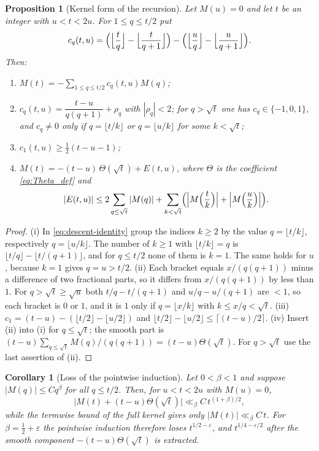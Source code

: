 \documentclass[11pt]{amsart}
\numberwithin{equation}{section}
\theoremstyle{plain}
\newtheorem{proposition}[theorem]{Proposition}
\newtheorem{corollary}[theorem]{Corollary}
\theoremstyle{definition}
\theoremstyle{remark}
\newcommand{\eps}{\varepsilon}
\begin{document}
\begin{proposition}[Kernel form of the recursion]
\label{prop:kernel}
Let $M(u)=0$ and let $t$ be an integer with $u<t<2u$. For $1\le q\le t/2$ put
\[
c_q(t,u)=\Bigl(\Bigl\lfloor\frac tq\Bigr\rfloor-\Bigl\lfloor\frac t{q+1}\Bigr\rfloor\Bigr)
-\Bigl(\Bigl\lfloor\frac uq\Bigr\rfloor-\Bigl\lfloor\frac u{q+1}\Bigr\rfloor\Bigr).
\]
Then:
\begin{enumerate}[label=\textup{(\roman*)}]
\item $M(t)=-\sum_{1\le q\le t/2}c_q(t,u)M(q)$;
\item $c_q(t,u)=\dfrac{t-u}{q(q+1)}+\rho_q$ with $|\rho_q|<2$; for $q>\sqrt t$
one has $c_q\in\{-1,0,1\}$, and $c_q\ne0$ only if $q=\lfloor t/k\rfloor$ or
$q=\lfloor u/k\rfloor$ for some $k<\sqrt t$;
\item $c_1(t,u)\ge\frac12(t-u-1)$;
\item $M(t)=-(t-u)\,\Theta(\sqrt t)+E(t,u)$, where $\Theta$ is the
coefficient \eqref{eq:Theta_def} and
\[
|E(t,u)|\le2\sum_{q\le\sqrt t}|M(q)|
+\sum_{k<\sqrt t}\Bigl(\Bigl|M\Bigl(\frac tk\Bigr)\Bigr|+\Bigl|M\Bigl(\frac uk\Bigr)\Bigr|\Bigr).
\]
\end{enumerate}
\end{proposition}

\begin{proof}
(i) In \eqref{eq:descent-identity} group the indices $k\ge2$ by the value
$q=\lfloor t/k\rfloor$, respectively $q=\lfloor u/k\rfloor$. The number of
$k\ge1$ with $\lfloor t/k\rfloor=q$ is
$\lfloor t/q\rfloor-\lfloor t/(q+1)\rfloor$, and for $q\le t/2$ none of them
is $k=1$. The same holds for $u$, because $k=1$ gives $q=u>t/2$. (ii) Each
bracket equals $x/(q(q+1))$ minus a difference of two fractional parts, so
it differs from $x/(q(q+1))$ by less than $1$. For $q>\sqrt t\ge\sqrt u$ both
$t/q-t/(q+1)$ and $u/q-u/(q+1)$ are $<1$, so each bracket is $0$ or $1$, and
it is $1$ only if $q=\lfloor x/k\rfloor$ with $k\le x/q<\sqrt t$.
(iii) $c_1=(t-u)-(\lfloor t/2\rfloor-\lfloor u/2\rfloor)$ and
$\lfloor t/2\rfloor-\lfloor u/2\rfloor\le\lceil(t-u)/2\rceil$.
(iv) Insert (ii) into (i) for $q\le\sqrt t$; the smooth part is
$(t-u)\sum_{q\le\sqrt t}M(q)/(q(q+1))=(t-u)\Theta(\sqrt t)$. For
$q>\sqrt t$ use the last assertion of (ii).
\end{proof}

\begin{corollary}[Loss of the pointwise induction]
\label{cor:induction-loss}
Let $0<\beta<1$ and suppose $|M(q)|\le Cq^\beta$ for all $q\le t/2$. Then,
for $u<t<2u$ with $M(u)=0$,
\begin{equation}
\label{eq:induction-loss}
\bigl|M(t)+(t-u)\Theta(\sqrt t)\bigr|\ll_\beta C\,t^{(1+\beta)/2},
\end{equation}
while the termwise bound of the full kernel gives only
$|M(t)|\ll_\beta C\,t$. For $\beta=\frac12+\eps$ the pointwise induction
therefore loses $t^{1/2-\eps}$, and $t^{1/4-\eps/2}$ after the smooth
component $-(t-u)\Theta(\sqrt t)$ is extracted.
\end{corollary}
\end{document}
